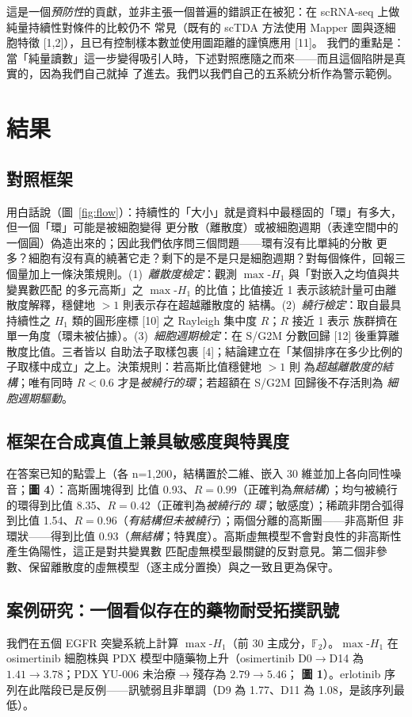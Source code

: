 \documentclass[11pt,a4paper]{article}
\newcommand{\maxh}{\ensuremath{\max\text{-}H_1}}
\begin{document}
這是一個\emph{預防性}的貢獻，並非主張一個普遍的錯誤正在被犯：在 scRNA-seq 上做純量持續性對條件的比較仍不
常見（既有的 scTDA 方法使用 Mapper 圖與逐細胞特徵 [1,2]），且已有控制樣本數並使用圖距離的謹慎應用 [11]。
我們的重點是：當「純量讀數」這一步變得吸引人時，下述對照應隨之而來——而且這個陷阱是真實的，因為我們自己就掉
了進去。我們以我們自己的五系統分析作為警示範例。

\section{結果}
\subsection*{對照框架}
用白話說（圖~\ref{fig:flow}）：持續性的「大小」就是資料中最穩固的「環」有多大，但一個「環」可能是被細胞變得
更分散（離散度）或被細胞週期（表達空間中的一個圓）偽造出來的；因此我們依序問三個問題——環有沒有比單純的分散
更多？細胞有沒有真的繞著它走？剩下的是不是只是細胞週期？對每個條件，回報三個量加上一條決策規則。(1)~\emph{離散度檢定}：觀測 \maxh{} 與「對嵌入之均值與共變異數匹配
的多元高斯」之 \maxh{} 的比值；比值接近 1 表示該統計量可由離散度解釋，穩健地 $>1$ 則表示存在超越離散度的
結構。(2)~\emph{繞行檢定}：取自最具持續性之 $H_1$ 類的圓形座標 [10] 之 Rayleigh 集中度 $R$；$R$ 接近 1 表示
族群擠在單一角度（環未被佔據）。(3)~\emph{細胞週期檢定}：在 S/G2M 分數回歸 [12] 後重算離散度比值。三者皆以
自助法子取樣包裹 [4]；結論建立在「某個排序在多少比例的子取樣中成立」之上。決策規則：若高斯比值穩健地 $>1$ 則
為\emph{超越離散度的結構}；唯有同時 $R<0.6$ 才是\emph{被繞行的環}；若超額在 S/G2M 回歸後不存活則為
\emph{細胞週期驅動}。

\subsection*{框架在合成真值上兼具敏感度與特異度}
在答案已知的點雲上（各 n=1{,}200，結構置於二維、嵌入 30 維並加上各向同性噪音；\textbf{圖 4}）：高斯團塊得到
比值 0.93、$R=0.99$（正確判為\emph{無結構}）；均勻被繞行的環得到比值 8.35、$R=0.42$（正確判為\emph{被繞行的
環}；敏感度）；稀疏非閉合弧得到比值 1.54、$R=0.96$（\emph{有結構但未被繞行}）；兩個分離的高斯團——非高斯但
非環狀——得到比值 0.93（\emph{無結構}；特異度）。高斯虛無模型不會對良性的非高斯性產生偽陽性，這正是對共變異數
匹配虛無模型最關鍵的反對意見。第二個非參數、保留離散度的虛無模型（逐主成分置換）與之一致且更為保守。

\subsection*{案例研究：一個看似存在的藥物耐受拓撲訊號}
我們在五個 EGFR 突變系統上計算 \maxh（前 30 主成分，$\mathbb{F}_2$）。\maxh{} 在 osimertinib 細胞株與 PDX
模型中隨藥物上升（osimertinib D0$\to$D14 為 $1.41\to3.78$；PDX YU-006 未治療$\to$殘存為 $2.79\to5.46$；
\textbf{圖 1}）。erlotinib 序列在此階段已是反例——訊號弱且非單調（D9 為 1.77、D11 為 1.08，是該序列最低）。
\end{document}
